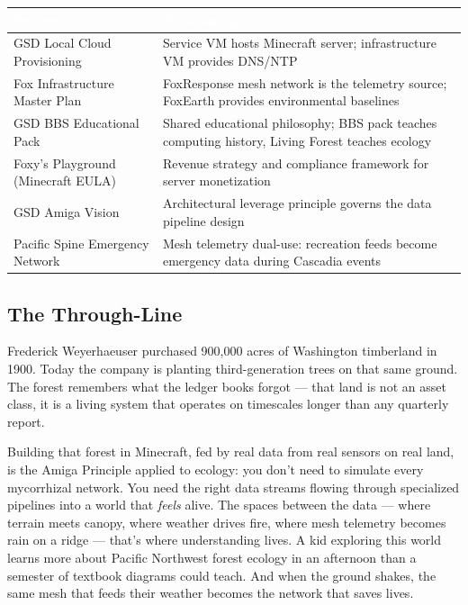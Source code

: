 \documentclass[11pt,letterpaper]{article}
\newcommand{\tableheader}[1]{\textbf{\sffamily\textcolor{white}{#1}}}
\begin{document}
\begin{center}
\begin{tabularx}{\textwidth}{L{4.5cm}X}
\toprule
{}
\tableheader{Document} & \tableheader{Relationship} \\
\midrule
GSD Local Cloud Provisioning & Service VM hosts Minecraft server; infrastructure VM provides DNS/NTP \\
Fox Infrastructure Master Plan & FoxResponse mesh network is the telemetry source; FoxEarth provides environmental baselines \\
GSD BBS Educational Pack & Shared educational philosophy; BBS pack teaches computing history, Living Forest teaches ecology \\
Foxy's Playground (Minecraft EULA) & Revenue strategy and compliance framework for server monetization \\
GSD Amiga Vision & Architectural leverage principle governs the data pipeline design \\
Pacific Spine Emergency Network & Mesh telemetry dual-use: recreation feeds become emergency data during Cascadia events \\
\bottomrule
\end{tabularx}
\end{center}

\subsection{The Through-Line}

Frederick Weyerhaeuser purchased 900,000 acres of Washington timberland in 1900. Today the company is planting third-generation trees on that same ground. The forest remembers what the ledger books forgot --- that land is not an asset class, it is a living system that operates on timescales longer than any quarterly report.

Building that forest in Minecraft, fed by real data from real sensors on real land, is the Amiga Principle applied to ecology: you don't need to simulate every mycorrhizal network. You need the right data streams flowing through specialized pipelines into a world that \emph{feels} alive. The spaces between the data --- where terrain meets canopy, where weather drives fire, where mesh telemetry becomes rain on a ridge --- that's where understanding lives. A kid exploring this world learns more about Pacific Northwest forest ecology in an afternoon than a semester of textbook diagrams could teach. And when the ground shakes, the same mesh that feeds their weather becomes the network that saves lives.
\end{document}
